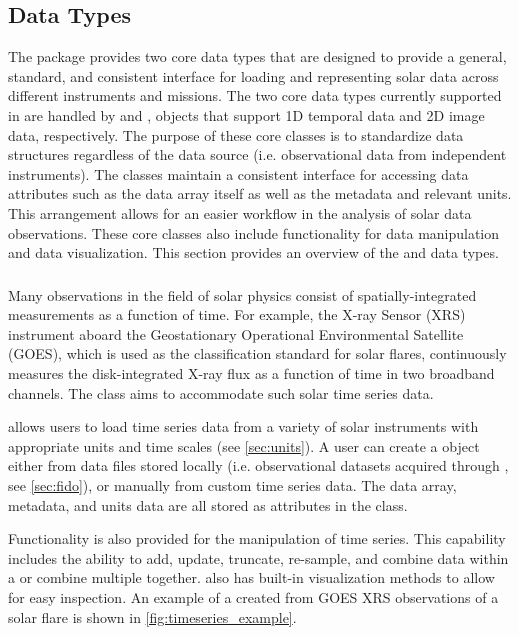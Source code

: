 \subsection{Data Types}
\label{sec:data_types}

The \sunpypkg package provides two core data types that are designed to provide a general, standard, and consistent interface for loading and representing solar data across different instruments and missions.
The two core data types currently supported in \sunpypkg are handled by \Timeseries and \Map, objects that support 1D temporal data and 2D image data, respectively.
The purpose of these core classes is to standardize data structures regardless of the data source (i.e. observational data from independent instruments).
The classes maintain a consistent interface for accessing data attributes such as the data array itself as well as the metadata and relevant units.
This arrangement allows for an easier workflow in the analysis of solar data observations.
These core classes also include functionality for data manipulation and data visualization.
This section provides an overview of the \Timeseries and \Map data types.

\subsubsection{\Timeseries}
\label{sec:timeseries}
Many observations in the field of solar physics consist of spatially-integrated measurements as a function of time.
For example, the X-ray Sensor (XRS) instrument aboard the Geostationary Operational Environmental Satellite (GOES), which is used as the classification standard for solar flares, continuously measures the disk-integrated X-ray flux as a function of time in two broadband channels.
The \Timeseries class aims to accommodate such solar time series data.

\Timeseries allows users to load time series data from a variety of solar instruments with appropriate units and time scales (see \autoref{sec:units}).
 A user can create a \Timeseries object either from data files stored locally (i.e. observational datasets acquired through \Fido, see \autoref{sec:fido}), or manually from custom time series data.
 The data array, metadata, and units data are all stored as attributes in the \Timeseries class.

Functionality is also provided for the manipulation of time series.
This capability includes the ability to add, update, truncate, re-sample, and combine data within a \Timeseries or combine multiple \Timeseries together.
\Timeseries also has built-in visualization methods to allow for easy inspection.
An example of a \Timeseries created from GOES XRS observations of a solar flare is shown in \autoref{fig:timeseries_example}.

